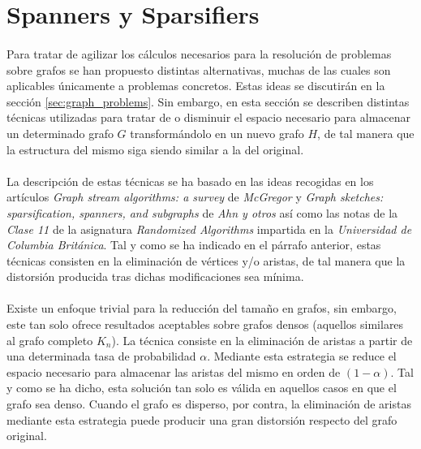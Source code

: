 \documentclass{subfiles}
\begin{document}
    \section{Spanners y Sparsifiers}
    \label{sec:spanners_sparsifiers}

      \paragraph{}
      Para tratar de agilizar los cálculos necesarios para la resolución de problemas sobre grafos se han propuesto distintas alternativas, muchas de las cuales son aplicables únicamente a problemas concretos. Estas ideas se discutirán en la sección \ref{sec:graph_problems}. Sin embargo, en esta sección se describen distintas técnicas utilizadas para tratar de  o disminuir el espacio necesario para almacenar un determinado grafo $G$ transformándolo en un nuevo grafo $H$, de tal manera que la estructura del mismo siga siendo similar a la del original.

      \paragraph{}
      La descripción de estas técnicas se ha basado en las ideas recogidas en los artículos \emph{Graph stream algorithms: a survey} \cite{mcgregor2014graph} de \emph{McGregor} y \emph{Graph sketches: sparsification, spanners, and subgraphs} \cite{ahn2012graph} de \emph{Ahn y otros} así como las notas de la \emph{Clase 11} de la asignatura \emph{Randomized Algorithms} \cite{harvey2011randomized} impartida en la \emph{Universidad de Columbia Británica}. Tal y como se ha indicado en el párrafo anterior, estas técnicas consisten en la eliminación de vértices y/o aristas, de tal manera que la distorsión producida tras dichas modificaciones sea mínima.

      \paragraph{}
      Existe un enfoque trivial para la reducción del tamaño en grafos, sin embargo, este tan solo ofrece resultados aceptables sobre grafos densos (aquellos similares al grafo completo $K_n$). La técnica consiste en la eliminación de aristas a partir de una determinada tasa de probabilidad $\alpha$. Mediante esta estrategia se reduce el espacio necesario para almacenar las aristas del mismo en orden de $(1-\alpha)$. Tal y como se ha dicho, esta solución tan solo es válida en aquellos casos en que el grafo sea denso. Cuando el grafo es disperso, por contra, la eliminación de aristas mediante esta estrategia puede producir una gran distorsión respecto del grafo original.
\end{document}
